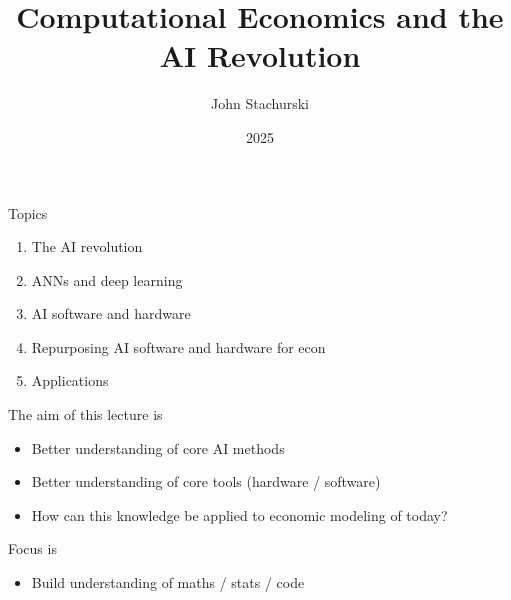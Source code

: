 


\title{Computational Economics and the AI Revolution}



\author{John Stachurski}


\date{2025}




\begin{frame}
  \titlepage
\end{frame}



\begin{frame}{Topics}

    \begin{enumerate}
        \item The AI revolution
        \vspace{0.5em}
        \item ANNs and deep learning
        \vspace{0.5em}
        \item AI software and hardware
        \vspace{0.5em}
        \item Repurposing AI software and hardware for econ
        \vspace{0.5em}
        \item Applications
    \end{enumerate}

\end{frame}

\begin{frame}
    
    The aim of this lecture is 
    \medskip


    \begin{itemize}
        \item Better understanding of core AI methods
        \medskip
        \item Better understanding of core tools (hardware / software)
        \medskip
        \item How can this knowledge be applied to economic modeling of today?
    \end{itemize}

    \medskip
    \medskip
    Focus is 
    \medskip


    \begin{itemize}
        \item Build understanding of maths / stats / code
    \end{itemize}

\end{frame}





